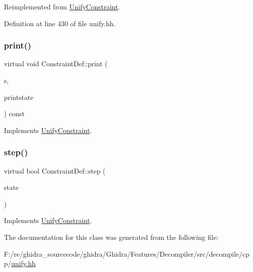 Reimplemented from \mbox{\hyperlink{class_unify_constraint_a44f0164f38ac1fdc44fc73ebe7678de1}{Unify\+Constraint}}.



Definition at line 430 of file unify.\+hh.

\mbox{\label{class_constraint_def_a3ff02cb8d29bdc23b916558eaf174639}} 
\subsubsection{\texorpdfstring{print()}{print()}}
{\footnotesize\ttfamily virtual void Constraint\+Def\+::print (\begin{DoxyParamCaption}\item[{ostream \&}]{s,  }\item[{\mbox{\hyperlink{class_unify_c_printer}{Unify\+C\+Printer}} \&}]{printstate }\end{DoxyParamCaption}) const\hspace{0.3cm}{\ttfamily [virtual]}}



Implements \mbox{\hyperlink{class_unify_constraint_a774f6a611a96384766cb8e8d8f5ff41f}{Unify\+Constraint}}.

\mbox{\label{class_constraint_def_acd26c5907c37a243b7edee01ce9b358d}} 
\subsubsection{\texorpdfstring{step()}{step()}}
{\footnotesize\ttfamily virtual bool Constraint\+Def\+::step (\begin{DoxyParamCaption}\item[{\mbox{\hyperlink{class_unify_state}{Unify\+State}} \&}]{state }\end{DoxyParamCaption})\hspace{0.3cm}{\ttfamily [virtual]}}



Implements \mbox{\hyperlink{class_unify_constraint_ad9ab4ad91037f96bf803735d414d212d}{Unify\+Constraint}}.



The documentation for this class was generated from the following file\+:\begin{DoxyCompactItemize}
\item 
F\+:/re/ghidra\+\_\+sourcecode/ghidra/\+Ghidra/\+Features/\+Decompiler/src/decompile/cpp/\mbox{\hyperlink{unify_8hh}{unify.\+hh}}\end{DoxyCompactItemize}

